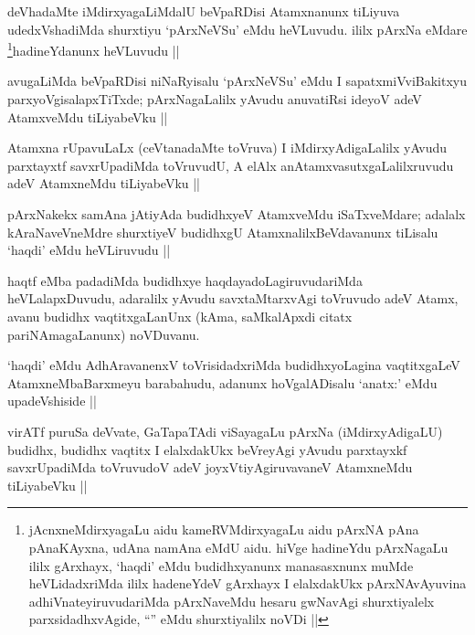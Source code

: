 \begin{artha}
deVhadaMte iMdirxyagaLiMdalU beVpaRDisi Atamxnanunx tiLiyuva udedxVshadiMda shurxtiyu `pArxNeVSu' eMdu heVLuvudu. ililx pArxNa eMdare \footnote{jAcnxneMdirxyagaLu aidu kameRVMdirxyagaLu aidu pArxNA pAna pAnaKAyxna, udAna namAna eMdU aidu. hiVge hadineYdu pArxNagaLu ililx gArxhayx, `haqdi' eMdu budidhxyanunx manasasxnunx muMde heVLidadxriMda ililx hadeneYdeV gArxhayx I elalxdakUkx pArxNAvAyuvina adhiVnateyiruvudariMda pArxNaveMdu hesaru gwNavAgi shurxtiyalelx parxsidadhxvAgide, ``\stext'' eMdu shurxtiyalilx noVDi ||}hadineYdanunx heVLuvudu ||
\end{artha}

\begin{artha}
avugaLiMda beVpaRDisi niNaRyisalu `pArxNeVSu' eMdu I sapatxmiVviBakitxyu parxyoVgisalapxTiTxde; pArxNagaLalilx yAvudu anuvatiRsi ideyoV adeV AtamxveMdu tiLiyabeVku ||
\end{artha}

\begin{artha}
Atamxna rUpavuLaLx (ceVtanadaMte toVruva) I iMdirxyAdigaLalilx yAvudu parxtayxtf savxrUpadiMda toVruvudU, A elAlx anAtamxvasutxgaLalilxruvudu adeV AtamxneMdu tiLiyabeVku ||
\end{artha}

\begin{artha}
pArxNakekx samAna jAtiyAda budidhxyeV AtamxveMdu iSaTxveMdare; adalalx kAraNaveVneMdre shurxtiyeV budidhxgU AtamxnalilxBeVdavanunx tiLisalu `haqdi' eMdu heVLiruvudu ||
\end{artha}

\begin{artha}
haqtf eMba padadiMda budidhxye haqdayadoLagiruvudariMda heVLalapxDuvudu, adaralilx yAvudu savxtaMtarxvAgi toVruvudo adeV Atamx, avanu budidhx vaqtitxgaLanUnx (kAma, saMkalApxdi citatx pariNAmagaLanunx) noVDuvanu.
\end{artha}

\begin{artha}
`haqdi' eMdu AdhAravanenxV toVrisidadxriMda budidhxyoLagina vaqtitxgaLeV AtamxneMbaBarxmeyu barabahudu, adanunx hoVgalADisalu `anatx:' eMdu upadeVshiside ||
\end{artha}

\begin{artha}
virATf puruSa deVvate, GaTapaTAdi viSayagaLu pArxNa (iMdirxyAdigaLU) budidhx, budidhx vaqtitx I elalxdakUkx beVreyAgi yAvudu parxtayxkf savxrUpadiMda toVruvudoV adeV joyxVtiyAgiruvavaneV AtamxneMdu tiLiyabeVku ||
\end{artha}

